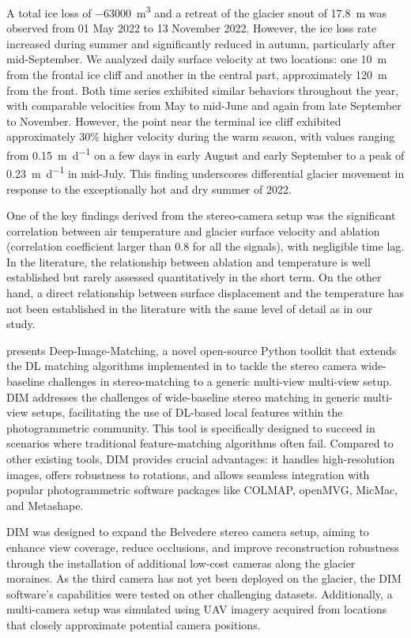 A total ice loss of \SI{-63000}{\cubic\meter} and a retreat of the glacier snout of \SI{17.8}{\meter} was observed from 01 May 2022 to 13 November 2022. 
However, the ice loss rate increased during summer and significantly reduced in autumn, particularly after mid-September. 
We analyzed daily surface velocity at two locations: one \SI{10}{\meter} from the frontal ice cliff and another in the central part, approximately \SI{120}{\meter} from the front. 
Both time series exhibited similar behaviors throughout the year, with comparable velocities from May to mid-June and again from late September to November.  
However, the point near the terminal ice cliff exhibited approximately 30\% higher velocity during the warm season,  with values ranging from \SI{0.15}{\meter\per\day} on a few days in early August and early September to a peak of \SI{0.23}{\meter\per\day} in mid-July.  
This finding underscores differential glacier movement in response to the exceptionally hot and dry summer of 2022.

One of the key findings derived from the stereo-camera setup was the significant correlation between air temperature and glacier surface velocity and ablation (correlation coefficient larger than 0.8 for all the signals), with negligible time lag. 
In the literature, the relationship between ablation and temperature is well established but rarely assessed quantitatively in the short term. 
On the other hand, a direct relationship between surface displacement and the temperature has not been established in the literature with the same level of detail as in our study.

 presents Deep-Image-Matching, a novel open-source Python toolkit that extends the DL matching algorithms implemented in  to tackle the stereo camera wide-baseline challenges in stereo-matching to a generic multi-view multi-view setup.
DIM addresses the challenges of wide-baseline stereo matching in generic multi-view setups, facilitating the use of DL-based local features within the photogrammetric community.
This tool is specifically designed to succeed in scenarios where traditional feature-matching algorithms often fail.
Compared to other existing tools, DIM provides crucial advantages: it handles high-resolution images, offers robustness to rotations, and allows seamless integration with popular photogrammetric software packages like COLMAP, openMVG, MicMac, and Metashape. 

DIM was designed to expand the Belvedere stereo camera setup, aiming to enhance view coverage, reduce occlusions, and improve reconstruction robustness through the installation of additional low-cost cameras along the glacier moraines.
As the third camera has not yet been deployed on the glacier, the DIM software's capabilities were tested on other challenging datasets. 
Additionally, a multi-camera setup was simulated using UAV imagery acquired from locations that closely approximate potential camera positions.

